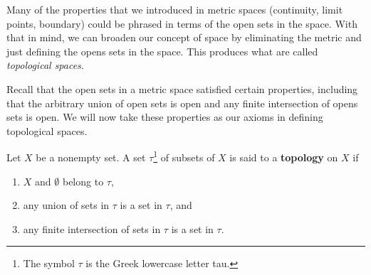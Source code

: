 \label{sec:top_spaces}


\vspace*{-17 pt}

\vspace*{13 pt}


Many of the properties that we introduced in metric spaces (continuity, limit points, boundary) could be phrased in terms of the open sets in the space. With that in mind, we can broaden our concept of space by eliminating the metric and just defining the opens sets in the space. This produces what are called \emph{topological spaces}.


Recall that the open sets in a metric space satisfied certain properties, including that the arbitrary union of open sets is open and any finite intersection of opens sets is open. We will now take these properties as our axioms in defining topological spaces. 

\begin{definition} Let $X$ be a nonempty set. A set $\tau$\footnote{The symbol $\tau$ is the Greek lowercase letter tau.}
 of subsets of $X$ is said to a \textbf{topology} on $X$ if
\begin{enumerate}
\item $X$ and $\emptyset$ belong to $\tau$,
\item any union of sets in $\tau$ is a set in $\tau$, and
\item any finite intersection of sets in $\tau$ is a set in $\tau$.
\end{enumerate}
\end{definition}

